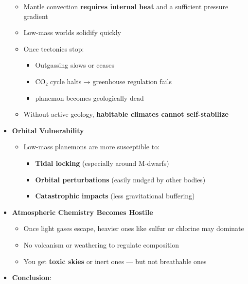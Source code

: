 \documentclass[
  letterpaper,
]{book}
\providecommand{\tightlist}{%
  \setlength{\itemsep}{0pt}\setlength{\parskip}{0pt}}
\begin{document}
\begin{itemize}
  \begin{itemize}
  \tightlist
  \item
    Mantle convection \textbf{requires internal heat} and a sufficient
    pressure gradient
  \item
    Low-mass worlds solidify quickly
  \item
    Once tectonics stop:

    \begin{itemize}
    \tightlist
    \item
      Outgassing slows or ceases
    \item
      CO₂ cycle halts → greenhouse regulation fails
    \item
      planemon becomes geologically dead
    \end{itemize}
  \item
    Without active geology, \textbf{habitable climates cannot
    self-stabilize}
  \end{itemize}
\item
  \textbf{Orbital Vulnerability}

  \begin{itemize}
  \tightlist
  \item
    Low-mass planemons are more susceptible to:

    \begin{itemize}
    \tightlist
    \item
      \textbf{Tidal locking} (especially around M-dwarfs)
    \item
      \textbf{Orbital perturbations} (easily nudged by other bodies)
    \item
      \textbf{Catastrophic impacts} (less gravitational buffering)
    \end{itemize}
  \end{itemize}
\item
  \textbf{Atmospheric Chemistry Becomes Hostile}

  \begin{itemize}
  \tightlist
  \item
    Once light gases escape, heavier ones like sulfur or chlorine may
    dominate
  \item
    No volcanism or weathering to regulate composition
  \item
    You get \textbf{toxic skies} or inert ones --- but not breathable
    ones
  \end{itemize}
\item
  \textbf{Conclusion}:


\end{itemize}
\end{document}
